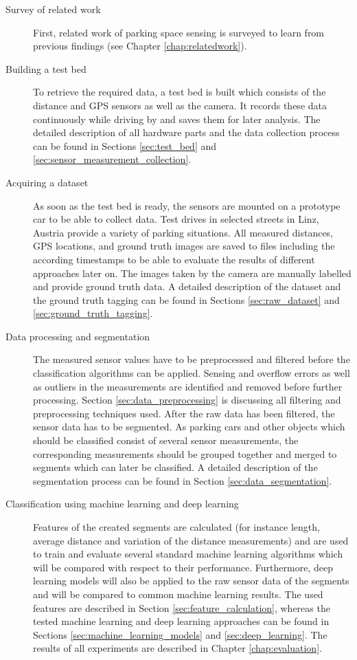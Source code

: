 \begin{description}

\item[Survey of related work] First, related work of parking space sensing is surveyed to learn from previous findings (see Chapter \ref{chap:relatedwork}).

\item[Building a test bed] To retrieve the required data, a test bed is built which consists of the distance and GPS sensors as well as the camera. It records these data continuously while driving by and saves them for later analysis. The detailed description of all hardware parts and the data collection process can be found in Sections \ref{sec:test_bed} and \ref{sec:sensor_measurement_collection}.

\item[Acquiring a dataset] As soon as the test bed is ready, the sensors are mounted on a prototype car to be able to collect data. Test drives in selected streets in Linz, Austria provide a variety of parking situations. All measured distances, GPS locations, and ground truth images are saved to files including the according timestamps to be able to evaluate the results of different approaches later on. The images taken by the camera are manually labelled and provide ground truth data. A detailed description of the dataset and the ground truth tagging can be found in Sections \ref{sec:raw_dataset} and \ref{sec:ground_truth_tagging}.

\item[Data processing and segmentation] The measured sensor values have to be preprocessed and filtered before the classification algorithms can be applied. Sensing and overflow errors as well as outliers in the measurements are identified and removed before further processing. Section \ref{sec:data_preprocessing} is discussing all filtering and preprocessing techniques used. After the raw data has been filtered, the sensor data has to be segmented. As parking cars and other objects which should be classified consist of several sensor measurements, the corresponding measurements should be grouped together and merged to segments which can later be classified. A detailed description of the segmentation process can be found in Section \ref{sec:data_segmentation}.

\item[Classification using machine learning and deep learning] Features of the created segments are calculated (for instance length, average distance and variation of the distance measurements) and are used to train and evaluate several standard machine learning algorithms which will be compared with respect to their performance. Furthermore, deep learning models will also be applied to the raw sensor data of the segments and will be compared to common machine learning results. The used features are described in Section \ref{sec:feature_calculation}, whereas the tested machine learning and deep learning approaches can be found in Sections \ref{sec:machine_learning_models} and \ref{sec:deep_learning}. The results of all experiments are described in Chapter \ref{chap:evaluation}.


\end{description}
